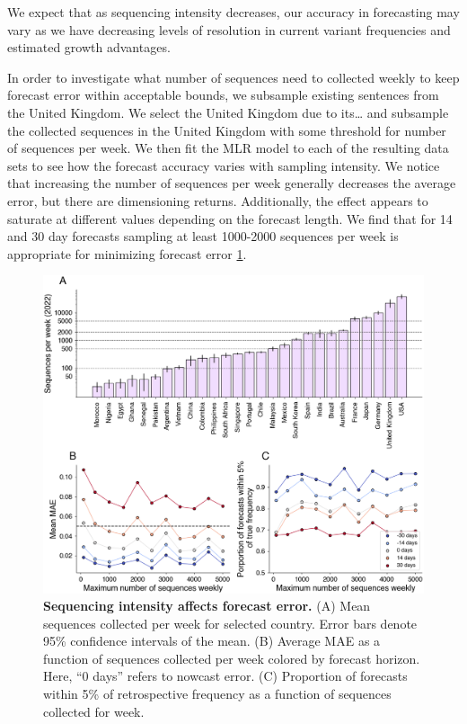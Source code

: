 \documentclass[11pt,oneside,letterpaper]{article}
\begin{document}
We expect that as sequencing intensity decreases, our accuracy in forecasting may vary as we have decreasing levels of resolution in current variant frequencies and estimated growth advantages.

In order to investigate what number of sequences need to collected weekly to keep forecast error within acceptable bounds, we subsample existing sentences from the United Kingdom.
We select the United Kingdom due to its… and subsample the collected sequences in the United Kingdom with some threshold for number of sequences per week.
We then fit the MLR model to each of the resulting data sets to see how the forecast accuracy varies with sampling intensity.
We notice that increasing the number of sequences per week generally decreases the average error, but there are dimensioning returns. 
Additionally, the effect appears to saturate at different values depending on the forecast length. 
We find that for 14 and 30 day forecasts sampling at least 1000-2000 sequences per week is appropriate for minimizing forecast error \ref{fig:downscaling}.


\begin{figure}[H]
    \centering
    \includegraphics[width=0.8\linewidth]{figures/downscaling_sequencing.png}
    \caption{\textbf{Sequencing intensity affects forecast error.}
    (A) Mean sequences collected per week for selected country. Error bars denote 95\% confidence intervals of the mean. 
    (B) Average MAE as a function of sequences collected per week colored by forecast horizon. Here, ``0 days'' refers to nowcast error. 
    (C) Proportion of forecasts within 5\% of retrospective frequency as a function of sequences collected for week.  }%
    \label{fig:downscaling}
\end{figure}
\end{document}
